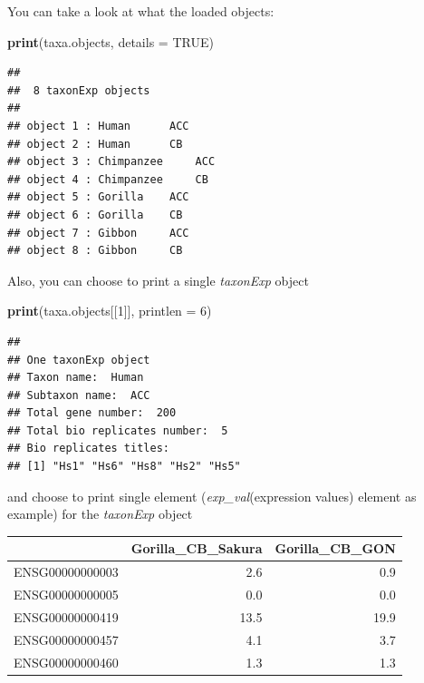\documentclass[]{book}
\newenvironment{Shaded}{\begin{snugshade}}{\end{snugshade}}
\newcommand{\DataTypeTok}[1]{\textcolor[rgb]{0.13,0.29,0.53}{#1}}
\newcommand{\DecValTok}[1]{\textcolor[rgb]{0.00,0.00,0.81}{#1}}
\newcommand{\KeywordTok}[1]{\textcolor[rgb]{0.13,0.29,0.53}{\textbf{#1}}}
\newcommand{\NormalTok}[1]{#1}
\newcommand{\OperatorTok}[1]{\textcolor[rgb]{0.81,0.36,0.00}{\textbf{#1}}}
\newcommand{\OtherTok}[1]{\textcolor[rgb]{0.56,0.35,0.01}{#1}}
\begin{document}
You can take a look at what the loaded objects:

\begin{Shaded}
\begin{Highlighting}[]
\KeywordTok{print}\NormalTok{(taxa.objects, }\DataTypeTok{details =} \OtherTok{TRUE}\NormalTok{)}
\end{Highlighting}
\end{Shaded}

\begin{verbatim}
## 
##  8 taxonExp objects 
## 
## object 1 : Human      ACC 
## object 2 : Human      CB 
## object 3 : Chimpanzee     ACC 
## object 4 : Chimpanzee     CB 
## object 5 : Gorilla    ACC 
## object 6 : Gorilla    CB 
## object 7 : Gibbon     ACC 
## object 8 : Gibbon     CB
\end{verbatim}

Also, you can choose to print a single \emph{taxonExp} object

\begin{Shaded}
\begin{Highlighting}[]
\KeywordTok{print}\NormalTok{(taxa.objects[[}\DecValTok{1}\NormalTok{]], }\DataTypeTok{printlen =} \DecValTok{6}\NormalTok{)}
\end{Highlighting}
\end{Shaded}

\begin{verbatim}
## 
## One taxonExp object
## Taxon name:  Human 
## Subtaxon name:  ACC 
## Total gene number:  200 
## Total bio replicates number:  5 
## Bio replicates titles:
## [1] "Hs1" "Hs6" "Hs8" "Hs2" "Hs5"
\end{verbatim}

and choose to print single element (\emph{exp\_val}(expression values) element as example) for the \emph{taxonExp} object

\begin{Shaded}
\end{Shaded}

\begin{tabular}{l|r|r}
\hline
  & Gorilla\_CB\_Sakura & Gorilla\_CB\_GON\\
\hline
ENSG00000000003 & 2.6 & 0.9\\
\hline
ENSG00000000005 & 0.0 & 0.0\\
\hline
ENSG00000000419 & 13.5 & 19.9\\
\hline
ENSG00000000457 & 4.1 & 3.7\\
\hline
ENSG00000000460 & 1.3 & 1.3\\
\hline
\end{tabular}
\end{document}
